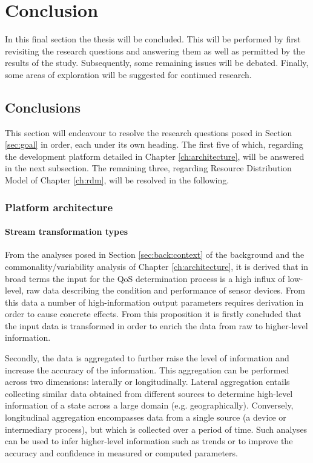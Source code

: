 
\chapter{Conclusion}
In this final section the thesis will be concluded. This will be performed by first revisiting the research questions and answering them as well as permitted by the results of the study. Subsequently, some remaining issues will be debated. Finally, some areas of exploration will be suggested for continued research.

\section{Conclusions}
\label{sec:conclusions}
This section will endeavour to resolve the research questions posed in Section \ref{sec:goal} in order, each under its own heading. The first five of which, regarding the development platform detailed in Chapter \ref{ch:architecture}, will be answered in the next subsection. The remaining three, regarding Resource Distribution Model of Chapter \ref{ch:rdm}, will be resolved in the following.
\subsection{Platform architecture}
\subsubsection{Stream transformation types}
From the analyses posed in Section \ref{sec:back:context} of the background and the commonality/variability analysis of Chapter \ref{ch:architecture}, it is derived that in broad terms the input for the QoS determination process is a high influx of low-level, raw data describing the condition and performance of sensor devices. From this data a number of high-information output parameters requires derivation in order to cause concrete effects. From this proposition it is firstly concluded that the input data is transformed in order to enrich the data from raw to higher-level information.

Secondly, the data is aggregated to further raise the level of information and increase the accuracy of the information. This aggregation can be performed across two dimensions: laterally or longitudinally. Lateral aggregation entails collecting similar data obtained from different sources to determine high-level information of a state across a large domain (e.g. geographically). Conversely, longitudinal aggregation encompasses data from a single source (a device or intermediary process), but which is collected over a period of time. Such analyses can be used to infer higher-level information such as trends or to improve the accuracy and confidence in measured or computed parameters.

